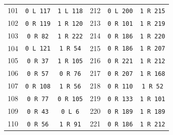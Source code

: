 \begin{longtable}{@{}rcc@{\hspace{14mm}}rcc@{}}
101 & \texttt{0 L 117} & \texttt{1 L 118} & 212 & \texttt{0 L 200} & \texttt{1 R 215}\\
102 & \texttt{0 R 119} & \texttt{1 R 120} & 213 & \texttt{0 R 101} & \texttt{1 R 219}\\
103 & \texttt{0 R 82} & \texttt{1 R 222} & 214 & \texttt{0 R 186} & \texttt{1 R 220}\\
104 & \texttt{0 L 121} & \texttt{1 R 54} & 215 & \texttt{0 R 186} & \texttt{1 R 207}\\
105 & \texttt{0 R 37} & \texttt{1 R 105} & 216 & \texttt{0 R 221} & \texttt{1 R 212}\\
106 & \texttt{0 R 57} & \texttt{0 R 76} & 217 & \texttt{0 R 207} & \texttt{1 R 168}\\
107 & \texttt{0 R 108} & \texttt{1 R 56} & 218 & \texttt{0 R 110} & \texttt{1 R 52}\\
108 & \texttt{0 R 77} & \texttt{0 R 105} & 219 & \texttt{0 R 133} & \texttt{1 R 101}\\
109 & \texttt{0 R 43} & \texttt{0 L 6} & 220 & \texttt{0 R 189} & \texttt{1 R 189}\\
110 & \texttt{0 R 56} & \texttt{1 R 91} & 221 & \texttt{0 R 186} & \texttt{1 R 212}\\
\end{longtable}
\endgroup
